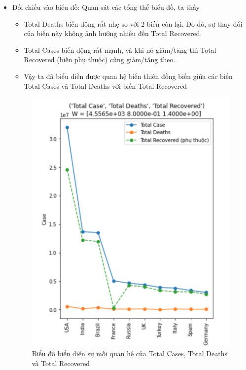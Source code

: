 \documentclass[a4paper, 12pt]{article}
\begin{document}
\begin{itemize}
\begin{itemize}
            \item Đối chiếu vào biểu đồ: Quan sát các tổng thể biểu đồ, ta thấy
            \begin{itemize}
                \item Total Deaths biến động rất nhẹ so với 2 biến còn lại. Do đó, sự thay đổi của biến này không ảnh hưởng nhiều đến Total Recovered.
                \item Total Cases biến động rất mạnh, và khi nó giảm/tăng thì Total Recovered (biến phụ thuộc) cũng giảm/tăng theo.
                \item Vậy ta đã biểu diễn được quan hệ biến thiên đồng biến giữa các biến Total Cases và Total Deaths với biến Total Recovered
            \end{itemize}
            \begin{figure}[H]
                \begin{center}
                    \includegraphics[scale=0.7]{img/lineChart.png}
                    \caption{Biểu đồ biểu diễn sự mối quan hệ của Total Cases, Total Deaths và Total Recovered}
                \end{center}
            \end{figure}


\end{itemize}
\end{itemize}
\end{document}
